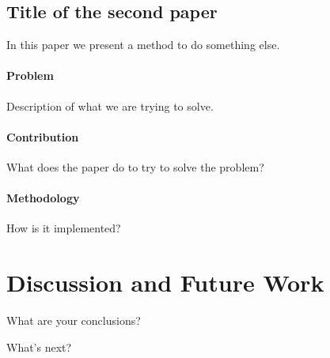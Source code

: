 \section{Title of the second paper}

In this paper we present a method to do something else.

\subsubsection*{Problem}

Description of what we are trying to solve.


\subsubsection*{Contribution}

What does the paper do to try to solve the problem?


\subsubsection*{Methodology}

How is it implemented?



\chapter{Discussion and Future Work}
\label{chap:discussion-future-work}

What are your conclusions?

What's next?
